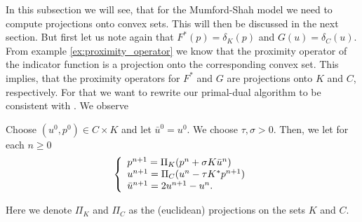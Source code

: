     	In this subsection we will see, that for the Mumford-Shah model we need to compute projections onto convex sets. This will then be discussed in the next section. But first let us note again that $F^{\ast}(p) = \delta_{K}(p)$ and $G(u) = \delta_{C}(u)$. From example \ref{ex:proximity_operator} we know that the proximity operator of the indicator function is a projection onto the corresponding convex set. This implies, that the proximity operators for $F^{\ast}$ and $G$ are projections onto $K$ and $C$, respectively. For that we want to rewrite our primal-dual algorithm to be consistent with \cite{Pock-et-al-iccv09}. We observe

    		\begin{algorithm}\label{alg:primal_dual_cremers}
                Choose $(u^{0}, p^{0}) \in C \times K$ and let $\bar{u}^{0} = u^{0}$. We choose $\tau, \sigma > 0$. Then, we let for each $n \ge 0$
                    \begin{equation}
                        \left\{ 
                            \begin{array}{l l}
                              p^{n+1} = \Pi_{K} (p^{n} + \sigma K \bar{u}^{n}) \\
                              u^{n+1} = \Pi_{C} (u^{n} - \tau K^{*} p^{n+1}) \\
                              \bar{u}^{n+1} = 2u^{n+1} - u^{n}.
                            \end{array}
                        \right.
                    \end{equation}
            \end{algorithm}

        Here we denote $\Pi_{K}$ and $\Pi_{C}$ as the (euclidean) projections on the sets $K$ and $C$.
        
    
